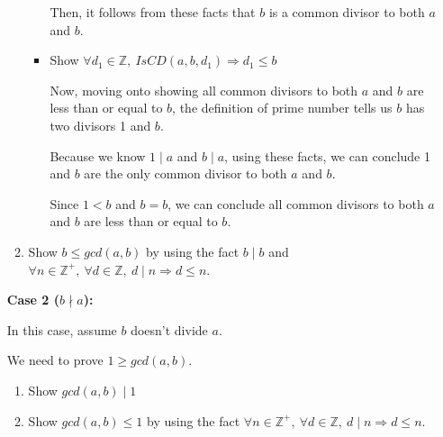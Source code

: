 \documentclass[12pt]{article}
\begin{document}
\begin{enumerate}[a.]
\begin{mdframed}
\begin{enumerate}[1.]
\begin{itemize}
\begin{mdframed}
                \bigskip

                Then, it follows from these facts that $b$ is a common divisor to
                both $a$ and $b$.

                \end{mdframed}

                \item Show $\forall d_1 \in \mathbb{Z},\:IsCD(a,b,d_1) \Rightarrow d_1 \leq b$

                \bigskip

                \begin{mdframed}

                Now, moving onto showing all common divisors to both $a$ and $b$
                are less than or equal to $b$, the definition of prime number
                tells us $b$ has two divisors 1 and $b$.

                \bigskip

                Because we know $1 \mid a$ and $b \mid a$, using these facts, we
                can conclude 1 and $b$ are the only common divisor to both $a$ and $b$.

                \bigskip

                Since $1 < b$ and $b = b$, we can conclude all common divisors to
                both $a$ and $b$ are less than or equal to $b$.

                \end{mdframed}
            \end{itemize}

            \item Show $b \leq gcd(a,b)$ by using the fact $b \mid b$ and $\forall n \in
            \mathbb{Z}^{+},\:\forall d \in \mathbb{Z},\:d \mid n \Rightarrow d \leq n$.
        \end{enumerate}

        \bigskip

        \textbf{Case 2 ($b \nmid a$):}

        \bigskip

        In this case, assume $b$ doesn't divide $a$.

        \bigskip

        We need to prove $1 \geq gcd(a,b)$.

        \bigskip

        \begin{enumerate}[1.]
            \item Show $gcd(a,b) \mid 1$
            \item Show $gcd(a,b) \leq 1$ by using the fact $\forall n \in
            \mathbb{Z}^{+},\:\forall d \in \mathbb{Z},\:d \mid n \Rightarrow d \leq n$.
        \end{enumerate}


\end{mdframed}
\end{enumerate}
\end{document}
